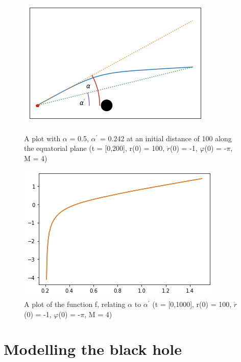 \documentclass[oneside,openright,frontopenright]{dmathesis}
\begin{document}
\begin{figure}
	\centering
	\begin{minipage}[b]{0.6\textwidth}
		\includegraphics[width=\textwidth]{img/alpha_alpha-prime}
		\caption{A plot with $\alpha$ = 0.5, $\alpha^{'}$ = 0.242 at an initial distance of 100 along the equatorial plane (t = [0,200], r(0) = 100, $\dot{r}$(0) = -1, $\varphi$(0) = -$\pi$, M = 4)}
	\end{minipage}
	\hfill
	\begin{minipage}[b]{0.6\textwidth}
		\includegraphics[width=\textwidth]{img/alpha-prime_f(alpha)}
		\caption{A plot of the function f, relating $\alpha$ to $\alpha^{'}$ (t = [0,1000], r(0) = 100, $\dot{r}$(0) = -1, $\varphi$(0) = -$\pi$, M = 4)}
	\end{minipage}
\end{figure}

\section{Modelling the black hole}
	
\end{document}
